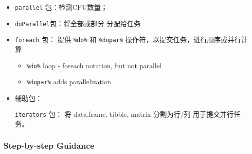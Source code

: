 \documentclass[
]{article}
\begin{document}
\begin{itemize}
\item
  \texttt{parallel} 包：检测CPU数量；
\item
  \texttt{doParallel}包：将全部或部分 分配给任务
\item
  \texttt{foreach} 包： 提供 \texttt{\%do\%} 和 \texttt{\%dopar\%}
  操作符，以提交任务，进行顺序或并行计算

  \begin{itemize}
  \item
    \texttt{\%do\%} loop - foreach notation, but not parallel
  \item
    \texttt{\%dopar\%} adds parallelization
  \end{itemize}
\item
  辅助包：

  \texttt{iterators} 包： 将 data.frame, tibble, matrix 分割为行/列
  用于提交并行任务。
\end{itemize}

\hypertarget{step-by-step-guidance}{%
\subsubsection{Step-by-step Guidance}\label{step-by-step-guidance}}
\end{document}
